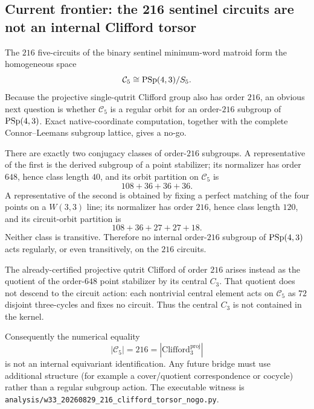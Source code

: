 \subsection*{Current frontier: the 216 sentinel circuits are not an internal Clifford torsor}

The \(216\) five-circuits of the binary sentinel minimum-word matroid form the
homogeneous space
\[
 \mathcal C_5\cong \mathrm{PSp}(4,3)/S_5.
\]
Because the projective single-qutrit Clifford group also has order \(216\), an
obvious next question is whether \(\mathcal C_5\) is a regular orbit for an
order-\(216\) subgroup of \(\mathrm{PSp}(4,3)\). Exact native-coordinate computation,
together with the complete Connor--Leemans subgroup lattice, gives a no-go.

There are exactly two conjugacy classes of order-\(216\) subgroups. A
representative of the first is the derived subgroup of a point stabilizer; its
normalizer has order \(648\), hence class length \(40\), and its orbit
partition on \(\mathcal C_5\) is
\[
 108+36+36+36.
\]
A representative of the second is obtained by fixing a perfect matching of
the four points on a \(W(3,3)\) line; its normalizer has order \(216\), hence
class length \(120\), and its circuit-orbit partition is
\[
 108+36+27+27+18.
\]
Neither class is transitive. Therefore no internal order-\(216\) subgroup of
\(\mathrm{PSp}(4,3)\) acts regularly, or even transitively, on the \(216\) circuits.

The already-certified projective qutrit Clifford of order \(216\) arises
instead as the quotient of the order-\(648\) point stabilizer by its central
\(C_3\). That quotient does not descend to the circuit action: each nontrivial
central element acts on \(\mathcal C_5\) as \(72\) disjoint three-cycles and
fixes no circuit. Thus the central \(C_3\) is not contained in the kernel.

Consequently the numerical equality
\[
 |\mathcal C_5|=216=|\mathrm{Clifford}_3^{\mathrm{proj}}|
\]
is not an internal equivariant identification. Any future bridge must use
additional structure (for example a cover/quotient correspondence or cocycle)
rather than a regular subgroup action. The executable witness is
\texttt{analysis/w33\_20260829\_216\_clifford\_torsor\_nogo.py}.
